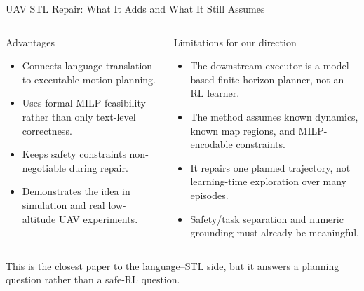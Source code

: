 \documentclass[aspectratio=169]{beamer}
\begin{document}
\begin{frame}{UAV STL Repair: What It Adds and What It Still Assumes}
\begin{columns}[T]
\begin{block}{Advantages}
\small
\begin{itemize}
  \item Connects language translation to executable motion planning.
  \item Uses formal MILP feasibility rather than only text-level correctness.
  \item Keeps safety constraints non-negotiable during repair.
  \item Demonstrates the idea in simulation and real low-altitude UAV experiments.
\end{itemize}
\end{block}

\begin{block}{Limitations for our direction}
\small
\begin{itemize}
  \item The downstream executor is a model-based finite-horizon planner, not an RL learner.
  \item The method assumes known dynamics, known map regions, and MILP-encodable constraints.
  \item It repairs one planned trajectory, not learning-time exploration over many episodes.
  \item Safety/task separation and numeric grounding must already be meaningful.
\end{itemize}
\end{block}
\end{columns}

\vspace{0.35em}
\begin{center}
\small
This is the closest paper to the language--STL side, but it answers a planning question rather than a safe-RL question.
\end{center}
\end{frame}
\end{document}
